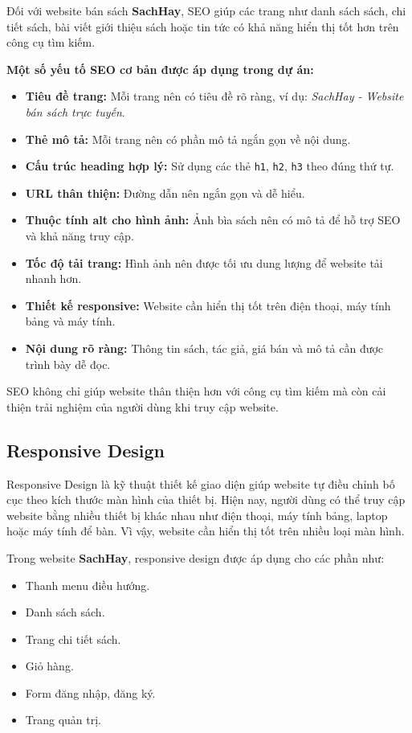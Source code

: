 Đối với website bán sách \textbf{SachHay}, SEO giúp các trang như danh sách sách, chi tiết sách, bài viết giới thiệu sách hoặc tin tức có khả năng hiển thị tốt hơn trên công cụ tìm kiếm.

\textbf{Một số yếu tố SEO cơ bản được áp dụng trong dự án:}

\begin{itemize}
	\item \textbf{Tiêu đề trang:} Mỗi trang nên có tiêu đề rõ ràng, ví dụ: \textit{SachHay - Website bán sách trực tuyến}.
	\item \textbf{Thẻ mô tả:} Mỗi trang nên có phần mô tả ngắn gọn về nội dung.
	\item \textbf{Cấu trúc heading hợp lý:} Sử dụng các thẻ \texttt{h1}, \texttt{h2}, \texttt{h3} theo đúng thứ tự.
	\item \textbf{URL thân thiện:} Đường dẫn nên ngắn gọn và dễ hiểu.
	\item \textbf{Thuộc tính alt cho hình ảnh:} Ảnh bìa sách nên có mô tả để hỗ trợ SEO và khả năng truy cập.
	\item \textbf{Tốc độ tải trang:} Hình ảnh nên được tối ưu dung lượng để website tải nhanh hơn.
	\item \textbf{Thiết kế responsive:} Website cần hiển thị tốt trên điện thoại, máy tính bảng và máy tính.
	\item \textbf{Nội dung rõ ràng:} Thông tin sách, tác giả, giá bán và mô tả cần được trình bày dễ đọc.
\end{itemize}

SEO không chỉ giúp website thân thiện hơn với công cụ tìm kiếm mà còn cải thiện trải nghiệm của người dùng khi truy cập website.

\subsection{Responsive Design}

Responsive Design là kỹ thuật thiết kế giao diện giúp website tự điều chỉnh bố cục theo kích thước màn hình của thiết bị. Hiện nay, người dùng có thể truy cập website bằng nhiều thiết bị khác nhau như điện thoại, máy tính bảng, laptop hoặc máy tính để bàn. Vì vậy, website cần hiển thị tốt trên nhiều loại màn hình.

Trong website \textbf{SachHay}, responsive design được áp dụng cho các phần như:

\begin{itemize}
	\item Thanh menu điều hướng.
	\item Danh sách sách.
	\item Trang chi tiết sách.
	\item Giỏ hàng.
	\item Form đăng nhập, đăng ký.
	\item Trang quản trị.
\end{itemize}

